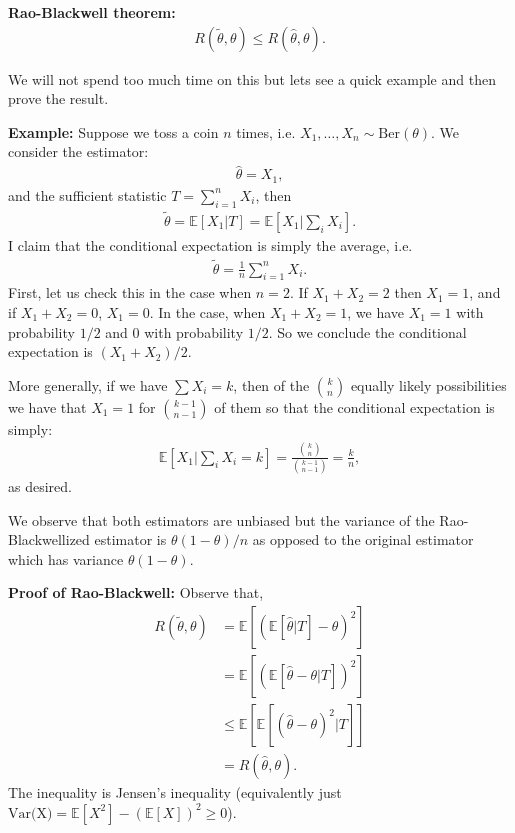 \documentclass[twoside,12pt]{article}
\begin{document}
{\bf Rao-Blackwell theorem: } 
\begin{align*}
R(\widetilde{\theta},\theta) \leq R(\widehat{\theta},\theta).
\end{align*}


We will not spend too much time on this but lets see a quick example and then prove the result.

{\bf Example: } Suppose we toss a coin $n$ times, i.e. $X_1,\ldots,X_n \sim \text{Ber}(\theta)$. We consider the estimator:
\begin{align*}
\widehat{\theta} = X_1,
\end{align*}
and the sufficient statistic $T = \sum_{i=1}^n X_i$, then 
\begin{align*}
\widetilde{\theta} = \mathbb{E}[X_1 | T] = \mathbb{E}[X_1 | \sum_i X_i].
\end{align*}
I claim that the conditional expectation is simply the average, i.e. 
\begin{align*}
\widetilde{\theta} = \frac{1}{n} \sum_{i=1}^n X_i.
\end{align*}
First, let us check this in the case when $n = 2$. If $X_1 + X_2 = 2$ then $X_1 = 1$, and if $X_1 + X_2 = 0$, $X_1 = 0$. In the case, when $X_1 + X_2 = 1$, we have $X_1 = 1$ with probability $1/2$ and $0$ with probability $1/2.$ So we conclude the conditional expectation is $(X_1+X_2)/2$.

More generally, if we have $\sum X_i = k$, then of the ${k \choose n}$ equally likely possibilities we have that $X_1 = 1$ for ${k-1 \choose n-1}$ of them so that the conditional expectation is simply:
\begin{align*}
\mathbb{E}[X_1 | \sum_i X_i = k] = \frac{{k \choose n} }{{k-1 \choose n-1}} = \frac{k}{n},
\end{align*}
as desired.

We observe that both estimators are unbiased but the variance of the Rao-Blackwellized estimator is $\theta(1-\theta)/n$ as opposed to the original estimator which has variance $\theta(1 - \theta)$.



{\bf Proof of Rao-Blackwell: } Observe that,
\begin{align*}
R(\widetilde{\theta},\theta) &= \mathbb{E} [ (\mathbb{E}[\widehat{\theta} | T] - \theta)^2 ] \\
&=  \mathbb{E} [ (\mathbb{E}[\widehat{\theta}- \theta | T] )^2 ] \\
&\leq  \mathbb{E} [ \mathbb{E}[(\widehat{\theta}- \theta)^2 | T] ] \\
&= R(\widehat{\theta},\theta).
\end{align*}
The inequality is Jensen's inequality (equivalently just $\text{Var(X)} = \mathbb{E}[X^2] - (\mathbb{E}[X])^2 \geq 0$).
\end{document}
